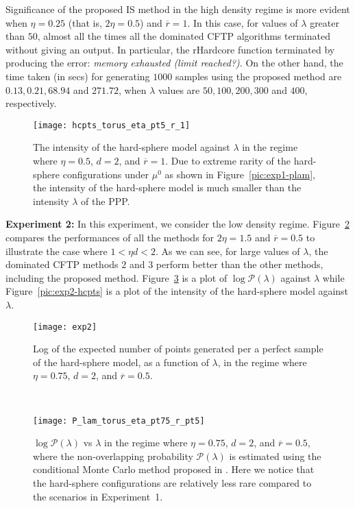 \documentclass[11pt]{article}
\newcommand{\rbdd}{\overline{r}}
\newcommand{\pno}{\mathcal{P}(\lambda)}
\begin{document}
Significance of the proposed IS method in the high density regime is more evident when $\eta = 0.25$ (that is, $2\eta = 0.5$) and $\rbdd = 1$. In this case, for values of $\lambda$ greater than $50$,  almost all the times all the dominated CFTP algorithms terminated without giving an output. In particular, 
the {\sf rHardcore} function terminated by producing  the error: {\em memory exhausted (limit reached?)}. On the other hand, the time taken (in secs) for generating $1000$ samples using the proposed method  are $0.13, 0.21, 68.94$ and $271.72$, when $\lambda$ values are $50, 100, 200, 300$ and $400$, respectively.\\
 


\begin{figure}[H]
 \centering
\texttt{[image: hcpts\_torus\_eta\_pt5\_r\_1]}
\caption{The intensity of the hard-sphere model against $\lambda$ in the regime where $\eta = 0.5$, $d = 2$, and $\rbdd = 1$. Due to extreme rarity of the hard-sphere configurations under $\mu^{0}$ as shown in Figure~\ref{pic:exp1-plam}, the intensity of the hard-sphere model is much smaller than the intensity $\lambda$ of the PPP.}
\label{pic:exp1-hcpts}
\end{figure}


\noindent
{\bf Experiment 2:}  In this experiment, we consider the low density regime. Figure~\ref{pic:Compare2} compares the performances of all the methods for $2\eta  = 1.5$ and $\rbdd = 0.5$ to illustrate the case where $1 < \eta d < 2$. As we can see, for large values of $\lambda$, the dominated CFTP methods $2$ and $3$ perform better than the other methods, including the proposed method. Figure~\ref{pic:exp2-plam} is a plot of $\log \pno$ against $\lambda$ while Figure~\ref{pic:exp2-hcpts} is a plot of the intensity of the hard-sphere model against $\lambda$.


\begin{figure}[h]
 \centering
\texttt{[image: exp2]}
\caption{Log of the expected number of points generated per a perfect sample of the hard-sphere model, as a function of $\lambda$, in the regime where $\eta = 0.75$, $d = 2$, and $\rbdd = 0.5$.}
\label{pic:Compare2}
\end{figure}
~
\begin{figure}[h]
 \centering
\texttt{[image: P\_lam\_torus\_eta\_pt75\_r\_pt5]}
\caption{$\log \pno$ vs $\lambda$ in the regime where $\eta = 0.75$, $d = 2$, and $\rbdd = 0.5$, where the non-overlapping probability $\pno$ is estimated using the conditional Monte Carlo method proposed in \cite{HMTK20}. Here we notice that the hard-sphere configurations are relatively less rare compared to the scenarios in Experiment~1.}
\label{pic:exp2-plam}
\end{figure}
\end{document}
